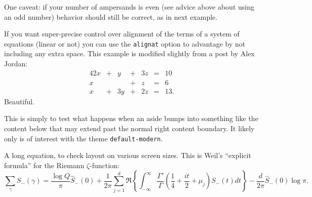 \documentclass[pdflatex]{sn-jnl}
\theoremstyle{thmstyleone}%
\theoremstyle{thmstyletwo}%
\theoremstyle{thmstylethree}%
\newcommand{\mono}[1]{\texttt{#1}}
\numberwithin{equation}{section}
\newcommand{\amp}{&}
\begin{document}
One caveat: if your number of ampersands is even (see advice above about using an odd number) behavior should still be correct, as in next example.%
\par
If you want super-precise control over alignment of the terms of a system of equations (linear or not) you can use the \mono{alignat} option to advantage by not including any extra space.  This example is modified slightly from a post by Alex Jordan:%
\begin{alignat*}{4}
2x \amp {}+{} \amp  y \amp {}+{} \amp 3z \amp {}={} \amp 10\\
x  \amp       \amp    \amp {}+{} \amp  z \amp {}={} \amp 6\\
x  \amp {}+{} \amp 3y \amp {}+{} \amp 2z \amp {}={} \amp 13.
\end{alignat*}
Beautiful.%
\begin{aside}\label{section-mathematics-4-8}%
%
This is simply to test what happens when an aside bumps into something like the content below that may extend past the normal right content boundary. It likely only is of interest with the theme \mono{default-modern}.%
\end{aside}
A long equation, to check layout on various screen sizes.  This is Weil's ``explicit formula'' for the Riemann \(\zeta\)-function:%
\begin{equation}
\sum_\gamma S_-(\gamma) = \frac{\log Q}{\pi} \hat S_-(0)
+ \frac{1}{2\pi} \sum_{j=1}^d \Re\left\{ \int_{-\infty}^\infty \frac{\Gamma'}{\Gamma}\left(\frac{1}{4} + \frac{it}{2} + \mu_j\right)S_-(t) dt\right\}
- \frac{d}{2\pi}\hat S_-(0)\log \pi\text{.}\label{section-mathematics-4-9-3}
\end{equation}
%
\end{document}
